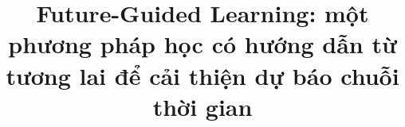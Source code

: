 
\title{Future-Guided Learning: một phương pháp học có hướng dẫn từ tương lai để cải thiện dự báo chuỗi thời gian}

